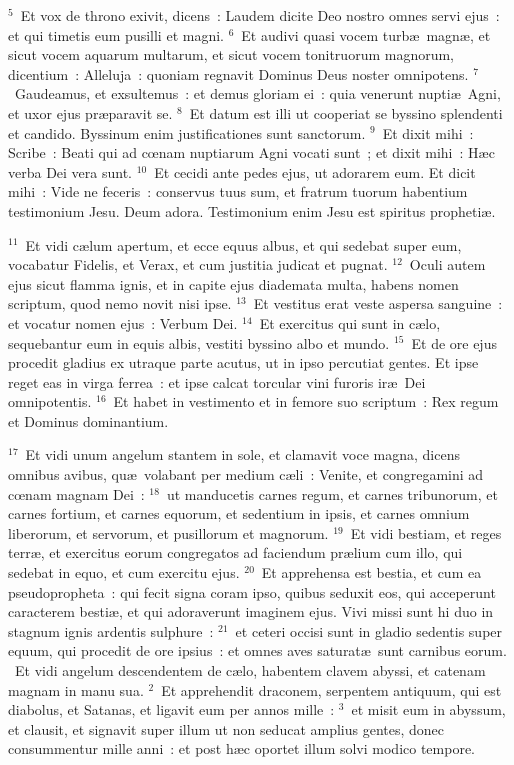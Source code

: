 ${}^{5}$~Et vox de throno exivit, dicens~: Laudem dicite Deo nostro omnes servi ejus~: et qui timetis eum pusilli et magni.
${}^{6}$~Et audivi quasi vocem turb\ae\ magn\ae , et sicut vocem aquarum multarum, et sicut vocem tonitruorum magnorum, dicentium~: Alleluja~: quoniam regnavit Dominus Deus noster omnipotens.
${}^{7}$~Gaudeamus, et exsultemus~: et demus gloriam ei~: quia venerunt nupti\ae\ Agni, et uxor ejus pr\ae paravit se.
${}^{8}$~Et datum est illi ut cooperiat se byssino splendenti et candido. Byssinum enim justificationes sunt sanctorum.
${}^{9}$~Et dixit mihi~: Scribe~: Beati qui ad cœnam nuptiarum Agni vocati sunt~; et dixit mihi~: H\ae c verba Dei vera sunt.
${}^{10}$~Et cecidi ante pedes ejus, ut adorarem eum. Et dicit mihi~: Vide ne feceris~: conservus tuus sum, et fratrum tuorum habentium testimonium Jesu. Deum adora. Testimonium enim Jesu est spiritus propheti\ae .


${}^{11}$~Et vidi c\ae lum apertum, et ecce equus albus, et qui sedebat super eum, vocabatur Fidelis, et Verax, et cum justitia judicat et pugnat.
${}^{12}$~Oculi autem ejus sicut flamma ignis, et in capite ejus diademata multa, habens nomen scriptum, quod nemo novit nisi ipse.
${}^{13}$~Et vestitus erat veste aspersa sanguine~: et vocatur nomen ejus~: Verbum Dei.
${}^{14}$~Et exercitus qui sunt in c\ae lo, sequebantur eum in equis albis, vestiti byssino albo et mundo.
${}^{15}$~Et de ore ejus procedit gladius ex utraque parte acutus, ut in ipso percutiat gentes. Et ipse reget eas in virga ferrea~: et ipse calcat torcular vini furoris ir\ae\ Dei omnipotentis.
${}^{16}$~Et habet in vestimento et in femore suo scriptum~: Rex regum et Dominus dominantium.


${}^{17}$~Et vidi unum angelum stantem in sole, et clamavit voce magna, dicens omnibus avibus, qu\ae\ volabant per medium c\ae li~: Venite, et congregamini ad cœnam magnam Dei~:
${}^{18}$~ut manducetis carnes regum, et carnes tribunorum, et carnes fortium, et carnes equorum, et sedentium in ipsis, et carnes omnium liberorum, et servorum, et pusillorum et magnorum.
${}^{19}$~Et vidi bestiam, et reges terr\ae , et exercitus eorum congregatos ad faciendum pr\ae lium cum illo, qui sedebat in equo, et cum exercitu ejus.
${}^{20}$~Et apprehensa est bestia, et cum ea pseudopropheta~: qui fecit signa coram ipso, quibus seduxit eos, qui acceperunt caracterem besti\ae , et qui adoraverunt imaginem ejus. Vivi missi sunt hi duo in stagnum ignis ardentis sulphure~:
${}^{21}$~et ceteri occisi sunt in gladio sedentis super equum, qui procedit de ore ipsius~: et omnes aves saturat\ae\ sunt carnibus eorum.
~\lettrine[lines=10,image=true,loversize=0.05,lraise=-0.03]{E}{}t vidi angelum descendentem de c\ae lo, habentem clavem abyssi, et catenam magnam in manu sua.
${}^{2}$~Et apprehendit draconem, serpentem antiquum, qui est diabolus, et Satanas, et ligavit eum per annos mille~:
${}^{3}$~et misit eum in abyssum, et clausit, et signavit super illum ut non seducat amplius gentes, donec consummentur mille anni~: et post h\ae c oportet illum solvi modico tempore.


